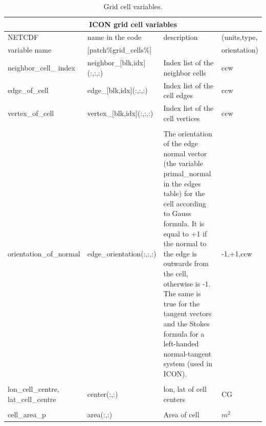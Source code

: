 \documentclass[a4paper,11pt,DIV16,BCOR1cm,titlepage]{scrartcl}
\begin{document}
\begin{table}[htdp]
\small
\begin{center}
\begin{tabular}{|m{3.2cm}|m{3.3cm}|m{6.8cm}|m{1.6cm}|}
\hline
\multicolumn{4}{|c|}{\textbf{ICON grid cell variables}}\\ \hline
NETCDF         & name in the code        & description & (units,type,    \\ 
variable name  & [patch\%grid\_cells\%]  &             &  orientation)    \\ 
\hline\hline
neighbor\_cell\_ index  & neighbor\_[blk,idx](:,:,:)  & Index list of the neighbor cells & ccw\\
edge\_of\_cell  & edge\_[blk,idx](:,:,:)   & Index list of the cell edges    & ccw\\
vertex\_of\_cell& vertex\_[blk,idx](:,:,:) & Index list of the cell vertices & ccw\\
 & & & \\
orientation\_of\_normal & edge\_orientation(:,:,:) & 
The orientation of the edge normal vector (the variable primal\_normal in the edges table) 
for the cell according to Gauss formula.
It is equal to +1 if the normal to the edge is outwards from the cell, otherwise is -1.
The same is true for the tangent vectors and the Stokes formula
for a left-handed normal-tangent system (used in ICON).
& -1,+1,ccw \\
 & & &   \\
lon\_cell\_centre, lat\_cell\_centre & center(:,:) & lon, lat of cell centers & CG \\
 & & & \\
cell\_area\_p & area(:,:) & Area of cell & $m^2$ \\
\hline
\end{tabular}
\caption{Grid cell variables.}\label{tbl:grid_cell_variables}
\end{center}
\end{table}
\end{document}
